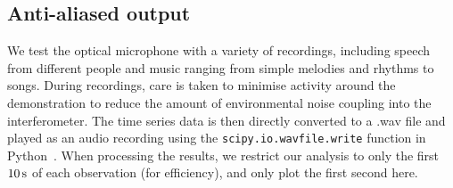 \documentclass[paper-main.tex]{subfiles}
\begin{document}

\subsection{Anti-aliased output}
\label{sec:initialResultsOpMic}

We test the optical microphone with a variety of recordings, including speech from different people and music ranging from simple melodies and rhythms to songs. During recordings, care is taken to minimise activity around the demonstration to reduce the amount of environmental noise coupling into the interferometer. The time series data is then directly converted to a .wav file and played as an audio recording using the \texttt{scipy.io.wavfile.write} function in Python~\cite{scipy,python}. When processing the results, we restrict our analysis to only the first $10\,{\rm s}$ of each observation (for efficiency), and only plot the first second here. 
\end{document}

